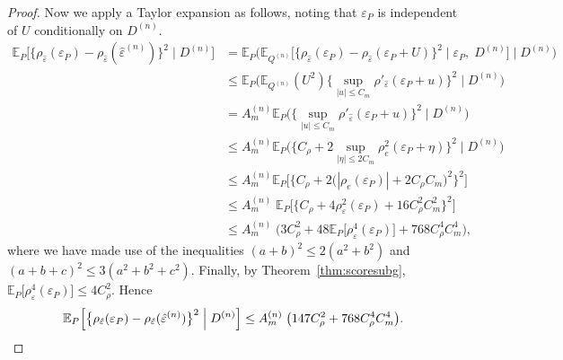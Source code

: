\documentclass[aos]{imsart}
\newcommand{\E}{\mathbb{E}}
\begin{document}
\begin{proof}
		Now we apply a Taylor expansion as follows, noting that $\varepsilon_P$ is independent of $U$ conditionally on $D^{(n)}$.
		\begin{align*}
			\E_P\Big[\big\{\rho_{\hat\varepsilon}(\varepsilon_P)-\rho_{\hat\varepsilon}(\hat\varepsilon^{(n)})\big\}^2 \; \Big| \; D^{(n)}\Big] &= \E_P\big(\E_{Q^{(n)}}\big[\{\rho_{\hat\varepsilon}(\varepsilon_P)-\rho_{\hat\varepsilon}(\varepsilon_P + U)\}^2 \; \big| \; \varepsilon_P, \; D^{(n)}\big] \; \big| \; D^{(n)} \big)\\
			&\leq \E_P\Bigg(\E_{Q^{(n)}}(U^2) \bigg\{\sup_{|u|\leq C_m} \rho'_{\hat\varepsilon} (\varepsilon_P + u)\bigg\}^2  \; \Bigg| \; D^{(n)} \Bigg)\\
			&= A_m^{(n)} \E_P\Bigg( \bigg\{\sup_{|u|\leq C_m} \rho'_{\hat\varepsilon} (\varepsilon_P + u)\bigg\}^2  \; \Bigg| \; D^{(n)} \Bigg)\\
			&\leq A_m^{(n)} \E_P\Bigg(\bigg\{C_\rho + 2\sup_{|\eta|\leq 2C_m} \rho_{e}^2 (\varepsilon_P + \eta)\bigg\}^2  \; \Bigg| \; D^{(n)} \Bigg)\\
			&\leq A_m^{(n)} \E_P\bigg[\Big\{C_\rho + 2\big(|\rho_{e} (\varepsilon_P)|  + 2C_\rho C_m \big)^2\Big\}^2 \bigg]\\
			&\leq  A_m^{(n)} \; \E_P\Big[\big\{C_\rho + 4\rho^2_\varepsilon(\varepsilon_P) + 16C_\rho^2C_m^2\big\}^2 \Big]\\
			&\leq  A_m^{(n)} \; \Big(3C_\rho^2 + 48 \E_P\big[\rho^4_\varepsilon(\varepsilon_P)\big] + 768 C_\rho^4C_m^4\Big),
		\end{align*}
		where we have made use of the inequalities $(a+b)^2 \leq 2(a^2+b^2)$ and $(a+b+c)^2 \leq 3(a^2+b^2+c^2)$. Finally, by Theorem~\ref{thm:scoresubg}, $\E_P\big[\rho^4_\varepsilon (\varepsilon_P)\big] \leq 4 C_\rho^2$. Hence 
		\begin{equation*}
			\E_P\Big[\big\{\rho_{\hat\varepsilon}(\varepsilon_P)-\rho_{\hat\varepsilon}(\hat\varepsilon^{(n)})\big\}^2 \; \Big| \; D^{(n)}\Big] \leq   A_m^{(n)} \; \big(147 C_\rho^2  + 768 C_\rho^4C_m^4\big). \qedhere
		\end{equation*}
	\end{proof}
	
	
	
\end{document}
